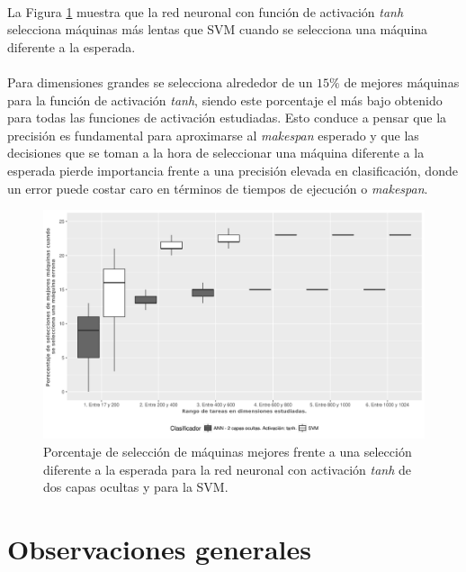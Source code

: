 \paragraph{} La Figura \ref{fig:tanh_mejores} muestra que la red neuronal con función de activación \textit{tanh} selecciona máquinas más lentas que SVM cuando se selecciona una máquina diferente a la esperada.

\paragraph{} Para dimensiones grandes se selecciona alrededor de un $15\%$ de mejores máquinas para la función de activación \textit{tanh}, siendo este porcentaje el más bajo obtenido para todas las funciones de activación estudiadas.
Esto conduce a pensar que la precisión es fundamental para aproximarse al \textit{makespan} esperado y que las decisiones que se toman a la hora de seleccionar una máquina diferente a la esperada pierde importancia frente a una precisión elevada en clasificación, donde un error puede costar caro en términos de tiempos de ejecución o \textit{makespan}.

\begin{figure}[H]
  \centering
  \includegraphics[width=\columnwidth]{imagenes/tanh/4_porcentaje_maquinas_mejores_ann_2_capas_ocultas_tanh.png}
  \caption{Porcentaje de selección de máquinas mejores frente a una selección diferente a la esperada para la red neuronal con activación \textit{tanh} de dos capas ocultas y para la SVM.}
  \label{fig:tanh_mejores}
\end{figure}

\section{Observaciones generales}

